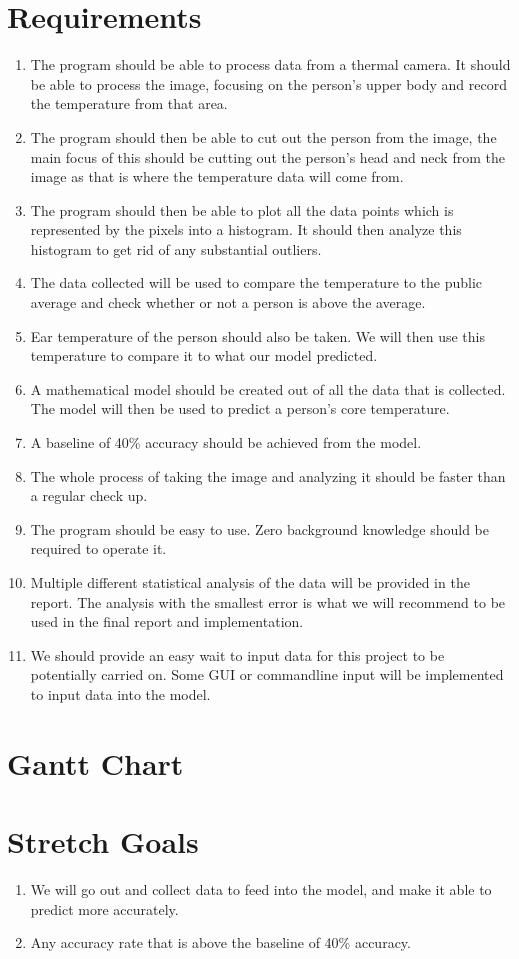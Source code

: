 \documentclass{article}
\begin{document}
\section*{Requirements}
	\begin{enumerate}
		\item The program should be able to process data from a thermal camera. It should be able to process the image, focusing on the person's upper body and record the temperature from that area.
		\item The program should then be able to cut out the person from the image, the main focus of this should be cutting out the person's head and neck from the image as that is where the temperature data will come from.
		\item The program should then be able to plot all the data points which is represented by the pixels into a histogram. It should then analyze this histogram to get rid of any substantial outliers.
		\item The data collected will be used to compare the temperature to the public average and check whether or not a person is above the average.
		\item Ear temperature of the person should also be taken. We will then use this temperature to compare it to what our model predicted.
		\item A mathematical model should be created out of all the data that is collected. The model will then be used to predict a person's core temperature.
		\item A baseline of 40\% accuracy should be achieved from the model.
		\item The whole process of taking the image and analyzing it should be faster than a regular check up.
		\item The program should be easy to use. Zero background knowledge should be required to operate it.
		\item Multiple different statistical analysis of the data will be provided in the report. The analysis with the smallest error is what we will recommend to be used in the final report and implementation.
		\item We should provide an easy wait to input data for this project to be potentially carried on. Some GUI or commandline input will be implemented to input data into the model.
	\end{enumerate}
\section*{Gantt Chart}
\section*{Stretch Goals}
	\begin{enumerate}
		\item We will go out and collect data to feed into the model, and make it able to predict more accurately.
		\item Any accuracy rate that is above the baseline of 40\% accuracy.
	\end{enumerate}
\end{document}

